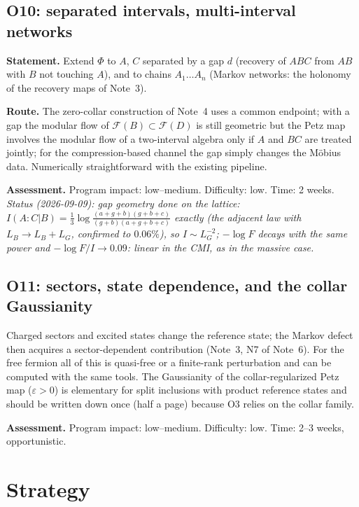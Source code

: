 \documentclass[11pt]{article}
\theoremstyle{accent}
\theoremstyle{definition}
\newcommand{\cF}{\mathcal{F}}
\newcommand{\eps}{\varepsilon}
\begin{document}
\subsection{O10: separated intervals, multi-interval networks}\label{sec:O10}
\textbf{Statement.} Extend \(\Phi\) to \(A\), \(C\) separated by a gap \(d\) (recovery of \(ABC\) from \(AB\) with \(B\) not touching \(A\)), and to chains \(A_1\dots A_n\) (Markov networks: the holonomy of the recovery maps of Note~3).

\textbf{Route.} The zero-collar construction of Note~4 uses a common endpoint; with a gap the modular flow of \(\cF(B)\subset\cF(D)\) is still geometric but the Petz map involves the modular flow of a two-interval algebra only if \(A\) and \(BC\) are treated jointly; for the compression-based channel the gap simply changes the M\"obius data.  Numerically straightforward with the existing pipeline.

\textbf{Assessment.} Program impact: low--medium.  Difficulty: low.  Time: 2 weeks.  \emph{Status (2026-09-09): gap geometry done on the lattice: \(I(A{:}C|B)=\frac13\log\frac{(a+g+b)(g+b+c)}{(g+b)(a+g+b+c)}\) exactly (the adjacent law with \(L_B\to L_B+L_G\), confirmed to \(0.06\%\)), so \(I\sim L_G^{-2}\); \(-\log F\) decays with the same power and \(-\log F/I\to0.09\): linear in the CMI, as in the massive case.}

\subsection{O11: sectors, state dependence, and the collar Gaussianity}\label{sec:O11}
Charged sectors and excited states change the reference state; the Markov defect then acquires a sector-dependent contribution (Note~3, N7 of Note~6).  For the free fermion all of this is quasi-free or a finite-rank perturbation and can be computed with the same tools.  The Gaussianity of the collar-regularized Petz map (\(\eps>0\)) is elementary for split inclusions with product reference states and should be written down once (half a page) because O3 relies on the collar family.

\textbf{Assessment.} Program impact: low--medium.  Difficulty: low.  Time: 2--3 weeks, opportunistic.

\section{Strategy}\label{sec:strategy}
\end{document}

